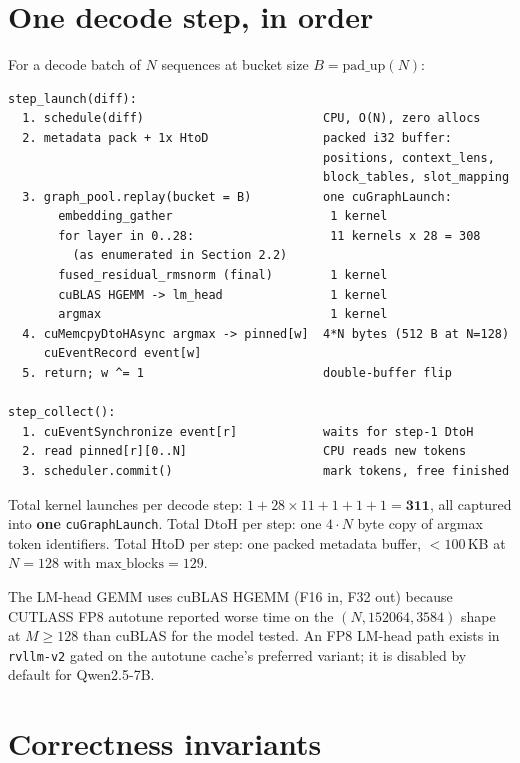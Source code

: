 \section{One decode step, in order}
\label{sec:step}

For a decode batch of $N$ sequences at bucket size
$B = \text{pad\_up}(N)$:

\begin{verbatim}
step_launch(diff):
  1. schedule(diff)                         CPU, O(N), zero allocs
  2. metadata pack + 1x HtoD                packed i32 buffer:
                                            positions, context_lens,
                                            block_tables, slot_mapping
  3. graph_pool.replay(bucket = B)          one cuGraphLaunch:
       embedding_gather                      1 kernel
       for layer in 0..28:                   11 kernels x 28 = 308
         (as enumerated in Section 2.2)
       fused_residual_rmsnorm (final)        1 kernel
       cuBLAS HGEMM -> lm_head               1 kernel
       argmax                                1 kernel
  4. cuMemcpyDtoHAsync argmax -> pinned[w]  4*N bytes (512 B at N=128)
     cuEventRecord event[w]
  5. return; w ^= 1                         double-buffer flip

step_collect():
  1. cuEventSynchronize event[r]            waits for step-1 DtoH
  2. read pinned[r][0..N]                   CPU reads new tokens
  3. scheduler.commit()                     mark tokens, free finished
\end{verbatim}

Total kernel launches per decode step: $1 + 28\!\times\!11 + 1 + 1 + 1
= \mathbf{311}$, all captured into \textbf{one} \texttt{cuGraphLaunch}.
Total DtoH per step: one $4\!\cdot\!N$ byte copy of argmax token
identifiers. Total HtoD per step: one packed metadata buffer,
${<}100$\,KB at $N\!=\!128$ with $\text{max\_blocks}\!=\!129$.

The LM-head GEMM uses cuBLAS HGEMM (F16 in, F32 out) because CUTLASS
FP8 autotune reported worse time on the $(N, 152064, 3584)$ shape at
$M\!\ge\!128$ than cuBLAS for the model tested. An FP8 LM-head path
exists in \texttt{rvllm-v2} gated on the autotune cache's preferred
variant; it is disabled by default for Qwen2.5-7B.

\section{Correctness invariants}
\label{sec:invariants}

